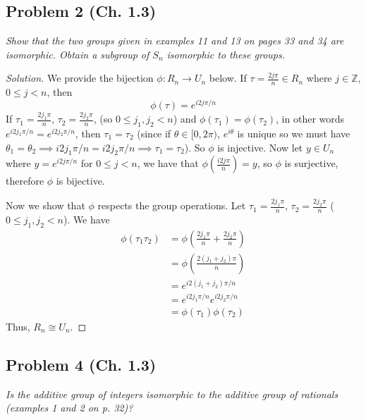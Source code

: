 \documentclass{article}
\newcommand{\Z}{{\mathbb Z}}
\begin{document}
\subsection*{Problem 2 (Ch. 1.3)}
{\it Show that the two groups given in examples 11 and 13 on pages 33 and 34 are isomorphic.
Obtain a subgroup of $S_n$ isomorphic to these groups.}

\begin{proof}[Solution]\let\qed\relax
	We provide the bijection $\phi \colon R_n \to U_n$ below.
	If $\tau = \frac{2j\pi}{n} \in R_n$ where $j \in \Z$, $0 \leq j < n$,
	then
	\[
		\phi(\tau) = e^{i2j\pi/n}
	\]
	If $\tau_1 = \frac{2j_1\pi}{n}$, $\tau_2 = \frac{2j_2\pi}{n}$,
	(so $0 \leq j_1,j_2<n$)
	and $\phi(\tau_1) = \phi(\tau_2)$,
	in other words $e^{i2j_1\pi/n} = e^{i2j_2\pi/n}$,
	then $\tau_1 = \tau_2$ (since
	if $\theta \in [0,2\pi)$, $e^{i\theta}$ is unique so
	we must have $\theta_1 = \theta_2 \implies i2j_1\pi/n =
	i2j_2\pi/n \implies \tau_1 = \tau_2$).
	So $\phi$ is injective.
	Now let $y \in U_n$ where $y = e^{i2j\pi/n}$ for $0 \leq j < n$,
	we have that $\phi(\frac{i2j\pi}{n}) = y$,
	so $\phi$ is surjective,
	therefore $\phi$ is bijective.

	Now we show that $\phi$ respects the group operations.
	Let $\tau_1 = \frac{2j_1\pi}{n}$, $\tau_2 = \frac{2j_2\pi}{n}$
	($0 \leq j_1,j_2<n$).
	We have
	\begin{align*}
		\phi(\tau_1\tau_2)
		&= \phi(\frac{2j_1\pi}{n} + \frac{2j_2\pi}{n})\\
		&= \phi(\frac{2(j_1 + j_2)\pi}{n})\\
		&= e^{i2(j_1 + j_2)\pi/n}\\
		&= e^{i2j_1\pi/n}e^{i2j_2\pi/n}\\
		&= \phi(\tau_1)\phi(\tau_2)
	\end{align*}
	Thus, $R_n \cong U_n$.
\end{proof}

\subsection*{Problem 4 (Ch. 1.3)}
{\it Is the additive group of integers isomorphic to the additive group of rationals
(examples 1 and 2 on p. 32)?}
\end{document}
